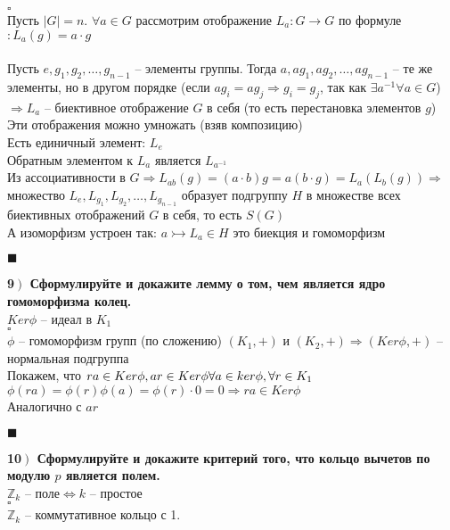 \documentclass[a4paper,12pt]{article}
\begin{document}
$\square$\\
Пусть $|G|=n$. $\forall a\in G$ рассмотрим отображение $L_a:G\rightarrow G$ по формуле$:L_a(g)=a\cdot g$\\
\\
Пусть $e, g_1, g_2, \ldots, g_{n-1}$ -- элементы группы. Тогда $a, ag_1, ag_2, \ldots, ag_{n-1}$ -- те же элементы, но в другом порядке (если $ag_i=ag_j\Rightarrow g_i=g_j$, так как $\exists a^{-1}\forall a\in G$)\\
$\Rightarrow L_a$ -- биективное отображение $G$ в себя (то есть перестановка элементов $g$)\\
Эти отображения можно умножать (взяв композицию)\\
Есть единичный элемент: $L_e$\\
Обратным элементом к $L_a$ является $L_{a^{-1}}$\\
Из ассоциативности в $G\Rightarrow L_{ab}(g)=(a\cdot b)g=a(b\cdot g)=L_a(L_b(g))\Rightarrow$ множество $L_e, L_{g_1}, L_{g_2}, \ldots, L_{g_{n-1}}$ образует подгруппу $H$ в множестве всех биективных отображений $G$  в себя, то есть $S(G)$\\
А изоморфизм устроен так: $a\rightarrowtail L_a\in H$ это биекция и гомоморфизм
\begin{flushright}
	$\blacksquare$
\end{flushright}
\textbf{9$\left.\right)$ Сформулируйте и докажите лемму о том, чем является ядро гомоморфизма колец.} \\$Ker\phi$ -- идеал в $K_1$\\
$\square$\\
$\phi$ -- гомоморфизм групп (по сложению) $(K_1, +)$ и $(K_2, +)\Rightarrow(Ker\phi, +)$ -- нормальная подгруппа\\
Покажем, что $ra\in Ker\phi, ar\in Ker\phi\\ \forall a\in ker\phi, \forall r\in K_1$\\
$\phi(ra)=\phi(r)\phi(a)=\phi(r)\cdot 0=0\Rightarrow ra\in Ker\phi$\\
Аналогично с $ar$
\begin{flushright}
	$\blacksquare$
\end{flushright}
\textbf{10$\left.\right)$ Сформулируйте и докажите критерий того, что кольцо вычетов по модулю $p$ является полем.}\\$\mathbb{Z}_k$ -- поле$\Leftrightarrow k$ -- простое\\
$\square$\\
$\mathbb{Z}_k$ -- коммутативное кольцо с 1.\\
\end{document}
